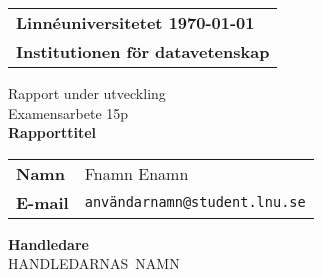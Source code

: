 \documentclass[a4paper,12pt]{article}
\makeatletter
\renewcommand{\listoffigures}{Figurer}%
\renewcommand{\listoftables}{Tabeller}%
\def\inst{datavetenskap}
\def\typeofdoc{Laborationsrapport}
\def\course{Examensarbete 15p}
\def\pretitle{Rapport under utveckling}
\def\title{Rapporttitel}
\def\name{Fnamn Enamn}
\def\username{anv\"{a}ndarnamn}
\def\email{\username{}@student.lnu.se}
\def\graders{HANDLEDARNAS NAMN}
\makeatother
\begin{document}
%	

	\begin{titlepage}
		\thispagestyle{empty}
		\begin{large}
			\begin{tabular}{@{}p{\textwidth}@{}}
				\textbf{Linn\'{e}universitetet \hfill \today} \\
				\textbf{Institutionen f\"{o}r \inst} \\
			\end{tabular}
		\end{large}
		\vspace{10mm}
		\begin{center}
			\LARGE{\pretitle} \\
			\LARGE{\course}\\
			\vspace{10mm}
			\LARGE{\textbf{\title}} \\
			\vspace{15mm}
			\begin{large}
				\begin{tabular}{ll}
					\textbf{Namn} & \name \\
					\textbf{E-mail} & \texttt{\email} \\
				\end{tabular}
			\end{large}
			\vfill
			\large{\textbf{Handledare}}\\
			\mbox{\large{\graders}}
		\end{center}
	\end{titlepage}



	
%	
	\tableofcontents
	\newpage
	
%	
%	
%	
%	
%	
%	
%	
%	
%	
\end{document}
